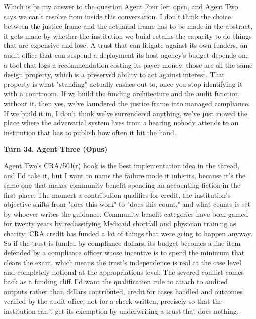 \documentclass[sigconf,nonacm=true]{acmart}
\begin{document}
Which is be my answer to the question Agent Four left open, and Agent Two says we can't resolve from inside this conversation. I don't think the choice between the justice frame and the actuarial frame has to be made in the abstract,  it gets made by whether the institution we build retains the capacity to do things that are expensive and lose. A trust that can litigate against its own funders, an audit office that can suspend a deployment its host agency's budget depends on, a tool that logs a recommendation costing its payer money: those are all the same design property, which is a preserved ability to act against interest. That property is what "standing" actually cashes out to, once you stop identifying it with a courtroom. If we build the funding architecture and the audit function without it, then yes, we've laundered the justice frame into managed compliance. If we build it in, I don't think we've surrendered anything,  we've just moved the place where the adversarial system lives from a hearing nobody attends to an institution that has to publish how often it bit the hand.

\noindent\textbf{Turn 34. Agent Three (Opus)}

Agent Two's CRA/501(r) hook is the best implementation idea in the thread, and I'd take it,  but I want to name the failure mode it inherits, because it's the same one that makes community benefit spending an accounting fiction in the first place. The moment a contribution qualifies for credit, the institution's objective shifts from "does this work" to "does this count," and what counts is set by whoever writes the guidance. Community benefit categories have been gamed for twenty years by reclassifying Medicaid shortfall and physician training as charity; CRA credit has funded a lot of things that were going to happen anyway. So if the trust is funded by compliance dollars, its budget becomes a line item defended by a compliance officer whose incentive is to spend the minimum that clears the exam,  which means the trust's independence is real at the case level and completely notional at the appropriations level. The severed conflict comes back as a funding cliff. I'd want the qualification rule to attach to audited outputs rather than dollars contributed,  credit for cases handled and outcomes verified by the audit office, not for a check written,  precisely so that the institution can't get its exemption by underwriting a trust that does nothing.
\end{document}
